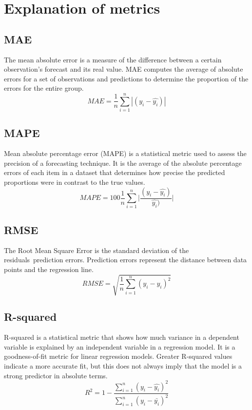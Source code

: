 \documentclass[conference]{IEEEtran}
\begin{document}
\section{Explanation of metrics}
\label{app:metrics}
\subsection{MAE}
The mean absolute error is a measure of the difference between a certain observation's forecast and its real value. MAE computes the average of absolute errors for a set of observations and predictions to determine the proportion of the errors for the entire group. 
$$MAE = \frac{1}{n}\sum_{i=1}^n|(y_i - \hat{y_i})|$$

\subsection{MAPE}
Mean absolute percentage error (MAPE) is a statistical metric used to assess the precision of a forecasting technique. It is the average of the absolute percentage errors of each item in a dataset that determines how precise the predicted proportions were in contrast to the true values. 
$$MAPE = 100\frac{1}{n}\sum_{i=1}^n\Bigg|\frac{(y_i - \hat{y_i})}{\hat{y_i})}\Bigg|$$

\subsection{RMSE}
The Root Mean Square Error is the standard deviation of the residuals prediction errors. Prediction errors represent the distance between data points and the regression line.
$$RMSE  = \sqrt{\frac{1}{n}\sum_{i=1}^n(y_i - \hat{y_i})^2}$$
\subsection{R-squared}
R-squared is a statistical metric that shows how much variance in a dependent variable is explained by an independent variable in a regression model. It is a goodness-of-fit metric for linear regression models. Greater R-squared values indicate a more accurate fit, but this does not always imply that the model is a strong predictor in absolute terms.
$$R^2  = 1 - \frac{\sum_{i=1}^n(y_i - \hat{y_i})^2}{\sum_{i=1}^n(y_i - \bar{y_i})^2}$$
\end{document}
